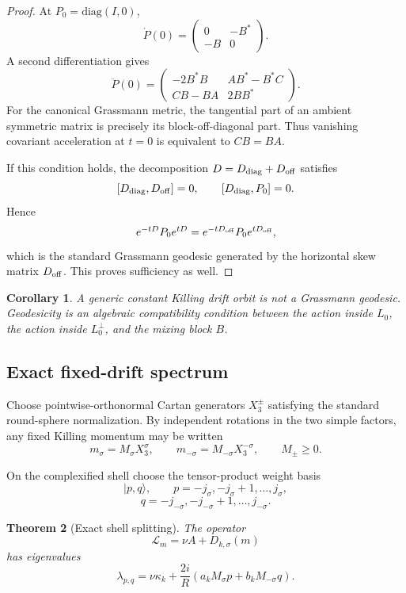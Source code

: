 \documentclass[
 aps,
 prd,
 reprint,
 amsmath,
 amssymb,
 nofootinbib,
 superscriptaddress
]{revtex4-2}
\newtheorem{theorem}{Theorem}[section]
\newtheorem{corollary}[theorem]{Corollary}
\theoremstyle{definition}
\theoremstyle{remark}
\begin{document}
\begin{proof}
At \(P_0=\mathrm{diag}(I,0)\),
\[
 \dot P(0)=
 \begin{pmatrix}
 0&-B^*\\
 -B&0
 \end{pmatrix}.
\]
A second differentiation gives
\[
 \ddot P(0)=
 \begin{pmatrix}
 -2B^*B&A B^*-B^*C\\
 CB-BA&2BB^*
 \end{pmatrix}.
\]
For the canonical Grassmann metric, the tangential part of an ambient
symmetric matrix is precisely its block-off-diagonal part.  Thus vanishing
covariant acceleration at \(t=0\) is equivalent to
\(CB=BA\).

If this condition holds, the decomposition
\(D=D_{\rm diag}+D_{\rm off}\) satisfies
\[
 [D_{\rm diag},D_{\rm off}]=0,
 \qquad
 [D_{\rm diag},P_0]=0.
\]
Hence
\[
 e^{-tD}P_0e^{tD}
 =
 e^{-tD_{\rm off}}P_0e^{tD_{\rm off}},
\]
which is the standard Grassmann geodesic generated by the horizontal
skew matrix \(D_{\rm off}\).  This proves sufficiency as well.
\end{proof}

\begin{corollary}
A generic constant Killing drift orbit is not a Grassmann geodesic.
Geodesicity is an algebraic compatibility condition between the action
inside \(L_0\), the action inside \(L_0^\perp\), and the mixing block \(B\).
\end{corollary}

\subsection{Exact fixed-drift spectrum}

Choose pointwise-orthonormal Cartan generators
\(X_3^\pm\) satisfying the standard round-sphere normalization.  By
independent rotations in the two simple factors, any fixed Killing momentum
may be written
\[
 m_\sigma=M_\sigma X_3^\sigma,
 \qquad
 m_{-\sigma}=M_{-\sigma}X_3^{-\sigma},
 \qquad
 M_\pm\ge0.
\]

On the complexified shell choose the tensor-product weight basis
\[
 |p,q\rangle,
 \qquad
 p=-j_\sigma,-j_\sigma+1,\ldots,j_\sigma,
\]
\[
 q=-j_{-\sigma},-j_{-\sigma}+1,\ldots,j_{-\sigma}.
\]

\begin{theorem}[Exact shell splitting]
\label{G:pr:thm:spectrum}
The operator
\[
 \mathcal L_m=\nu A+D_{k,\sigma}(m)
\]
has eigenvalues
\begin{equation}
 \boxed{
 \lambda_{p,q}
 =
 \nu\kappa_k
 +
 \frac{2i}{R}
 \left(
 a_kM_\sigma p+
 b_kM_{-\sigma}q
 \right).
 }
 \label{G:pr:eq:spectrum}
\end{equation}
\end{theorem}
\end{document}
